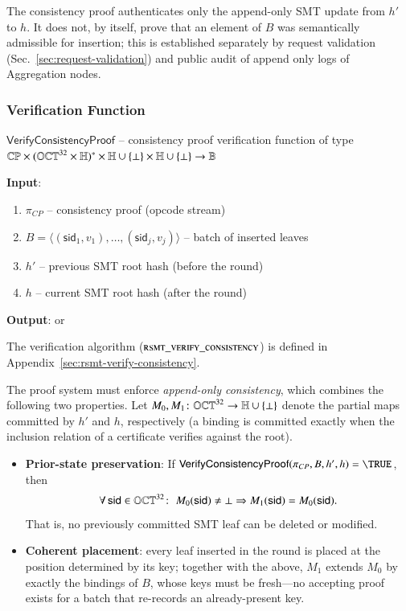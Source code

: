 The consistency proof authenticates only the append-only SMT update from $h'$ to $h$. It does not, by itself, prove that an element of $B$ was semantically admissible for insertion; this is established separately by request validation (Sec.~\ref{sec:request-validation}) and public audit of append only logs of Aggregation nodes.

\subsubsection{Verification Function}\label{VerifyConsistencyProof}

$\mathsf{VerifyConsistencyProof}$ -- consistency proof verification function of type $\mathbb{CP} \times (\mathbb{OCT}^{32} \times \mathbb{H})^\ast \times \mathbb{H}\cup\{\bot\} \times \mathbb{H}\cup\{\bot\} \to \mathbb{B}$

\textbf{Input}:
\begin{enumerate}
	\item $\pi_{CP}$ -- consistency proof (opcode stream)
	\item $B = \langle (\mathsf{sid}_1, v_1), \ldots, (\mathsf{sid}_j, v_j) \rangle$ -- batch of inserted leaves
	\item $h'$ -- previous SMT root hash (before the round)
	\item $h$ -- current SMT root hash (after the round)
\end{enumerate}

\textbf{Output}: \TRUE or \FALSE

The verification algorithm ($\textsc{rsmt\_verify\_consistency}$) is defined in Appendix~\ref{sec:rsmt-verify-consistency}.

The proof system must enforce \emph{append-only consistency}, which combines the following two properties. Let $M_0, M_1 \colon \mathbb{OCT}^{32} \to \mathbb{H}\cup\{\bot\}$ denote the partial maps committed by $h'$ and $h$, respectively (a binding is committed exactly when the inclusion relation of a certificate verifies against the root).

\begin{itemize}
	\item \textbf{Prior-state preservation}: If $\mathsf{VerifyConsistencyProof}(\pi_{CP}, B, h', h) = \TRUE$, then
	\[
		\forall\, \mathsf{sid} \in \mathbb{OCT}^{32}\colon\; M_0(\mathsf{sid}) \ne \bot \Rightarrow M_1(\mathsf{sid}) = M_0(\mathsf{sid}).
	\]
	That is, no previously committed SMT leaf can be deleted or modified.
	\item \textbf{Coherent placement}: every leaf inserted in the round is placed at the position determined by its key; together with the above, $M_1$ extends $M_0$ by exactly the bindings of $B$, whose keys must be fresh---no accepting proof exists for a batch that re-records an already-present key.
\end{itemize}

